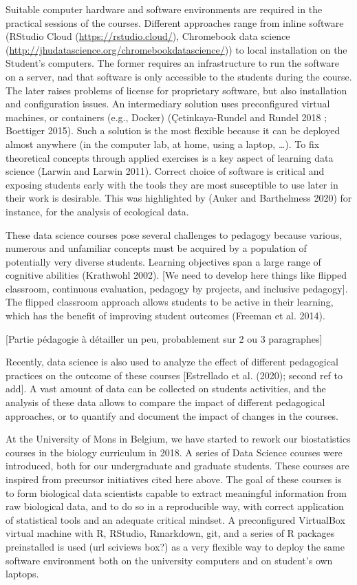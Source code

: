 \documentclass[
]{article}
\begin{document}
Suitable computer hardware and software environments are required in the
practical sessions of the courses. Different approaches range from
inline software (RStudio Cloud (\url{https://rstudio.cloud/}),
Chromebook data science
(\url{http://jhudatascience.org/chromebookdatascience/})) to local
installation on the Student's computers. The former requires an
infrastructure to run the software on a server, nad that software is
only accessible to the students during the course. The later raises
problems of license for proprietary software, but also installation and
configuration issues. An intermediary solution uses preconfigured
virtual machines, or containers (e.g., Docker) (Çetinkaya-Rundel and
Rundel 2018 ; Boettiger 2015). Such a solution is the most flexible
because it can be deployed almost anywhere (in the computer lab, at
home, using a laptop, \ldots). To fix theoretical concepts through
applied exercises is a key aspect of learning data science (Larwin and
Larwin 2011). Correct choice of software is critical and exposing
students early with the tools they are most susceptible to use later in
their work is desirable. This was highlighted by (Auker and Barthelmess
2020) for instance, for the analysis of ecological data.

These data science courses pose several challenges to pedagogy because
various, numerous and unfamiliar concepts must be acquired by a
population of potentially very diverse students. Learning objectives
span a large range of cognitive abilities (Krathwohl 2002). {[}We need
to develop here things like flipped classroom, continuous evaluation,
pedagogy by projects, and inclusive pedagogy{]}. The flipped classroom
approach allows students to be active in their learning, which has the
benefit of improving student outcomes (Freeman et al. 2014).

{[}Partie pédagogie à détailler un peu, probablement sur 2 ou 3
paragraphes{]}

Recently, data science is also used to analyze the effect of different
pedagogical practices on the outcome of these courses {[}Estrellado et
al. (2020); second ref to add{]}. A vast amount of data can be collected
on students activities, and the analysis of these data allows to compare
the impact of different pedagogical approaches, or to quantify and
document the impact of changes in the courses.

At the University of Mons in Belgium, we have started to rework our
biostatistics courses in the biology curriculum in 2018. A series of
Data Science courses were introduced, both for our undergraduate and
graduate students. These courses are inspired from precursor initiatives
cited here above. The goal of these courses is to form biological data
scientists capable to extract meaningful information from raw biological
data, and to do so in a reproducible way, with correct application of
statistical tools and an adequate critical mindset. A preconfigured
VirtualBox virtual machine with R, RStudio, Rmarkdown, git, and a series
of R packages preinstalled is used (url sciviews box?) as a very
flexible way to deploy the same software environment both on the
university computers and on student's own laptops.
\end{document}
